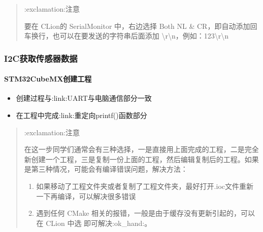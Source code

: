 \documentclass[a4paper,12pt,english]{sphinxmanual}
\begin{document}
\sphinxAtStartPar
{}
\begin{quote}

\sphinxAtStartPar
:exclamation:注意

\sphinxAtStartPar
要在 CLion的 SerialMonitor 中，右边选择 Both NL \& CR，即自动添加回车换行，也可以在要发送的字符串后面添加 \textbackslash{}r\textbackslash{}n，例如：123\textbackslash{}r\textbackslash{}n
\end{quote}


\subsubsection{I2C获取传感器数据}
\label{\detokenize{exp-stm32/peripherals-and-sensors:i2c}}

\paragraph{STM32CubeMX创建工程}
\label{\detokenize{exp-stm32/peripherals-and-sensors:id11}}\begin{itemize}
\item {} 
\sphinxAtStartPar
创建过程与:link:UART与电脑通信部分一致

\item {} 
\sphinxAtStartPar
在工程中完成:link:重定向printf()函数部分

\end{itemize}
\begin{quote}

\sphinxAtStartPar
:exclamation:注意

\sphinxAtStartPar
在这一步同学们通常会有三种选择，一是直接用上面完成的工程，二是完全新创建一个工程，三是复制一份上面的工程，然后编辑复制后的工程。如果是第三种情况，可能会有编译错误问题，解决方法：
\begin{enumerate}
%
\item {} 
\sphinxAtStartPar
如果移动了工程文件夹或者复制了工程文件夹，最好打开.ioc文件重新  一下再编译，可以解决很多错误

\item {} 
\sphinxAtStartPar
遇到任何 CMake 相关的报错，一般是由于缓存没有更新引起的，可以在 CLion 中选  即可解决:ok\_hand:。

\end{enumerate}
\end{quote}
\end{document}
